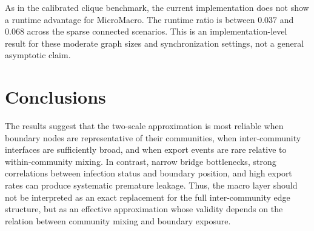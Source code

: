 \documentclass{article}
\begin{document}
As in the calibrated clique benchmark, the current implementation does not show a runtime advantage for MicroMacro. The runtime ratio is between \(0.037\) and \(0.068\) across the sparse connected scenarios. This is an implementation-level result for these moderate graph sizes and synchronization settings, not a general asymptotic claim.

\section{Conclusions}

The results suggest that the two-scale approximation is most reliable when boundary nodes are representative of their communities, when inter-community interfaces are sufficiently broad, and when export events are rare relative to within-community mixing. 
In contrast, narrow bridge bottlenecks, strong correlations between infection status and boundary position, and high export rates can produce systematic premature leakage. 
Thus, the macro layer should not be interpreted as an exact replacement for the full inter-community edge structure, but as an effective approximation whose validity depends on the relation between community mixing and boundary exposure.





\end{document}
